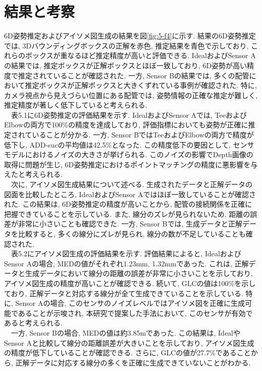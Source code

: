 \section{結果と考察}
6D姿勢推定およびアイソメ図生成の結果を図\ref{fig:5-f4}に示す. 
結果の6D姿勢推定では, 3Dバウンディングボックスの正解を赤色, 推定結果を青色で示しており, これらのボックスが重なるほど推定精度が高いと評価できる. 
IdealおよびSensor Aの結果では, 推定ボックスが正解ボックスとほぼ一致しており, 6D姿勢が高い精度で推定されていることが確認された. 
一方, Sensor Bの結果では, 多くの配管において推定ボックスが正解ボックスと大きくずれている事例が確認された. 
特に, カメラ視点から見えづらい位置にある配管では, 姿勢情報の正確な推定が難しく, 推定精度が著しく低下していると考えられる. \\
　表5.1に6D姿勢推定の評価結果を示す. 
IdealおよびSensor Aでは, TeeおよびElbowの両方で100\%の精度を達成しており, 評価指標においても姿勢が正確に推定されていることが分かる. 
一方, Sensor BではTeeおよびElbowの両方で精度が低下し, ADD-sucの平均値は42.5\%となった. 
この精度低下の要因として, センサモデルにおけるノイズの大きさが挙げられる. 
このノイズの影響でDepth画像の取得に問題が生じ, 6D姿勢推定におけるポイントマッチングの精度に悪影響を与えたと考えられる. \\
　次に, アイソメ図生成結果について述べる. 
生成されたデータと正解データの図面を比較したところ, IdealおよびSensor Aではほぼ一致していることが確認された. 
この結果は, 6D姿勢推定の精度が高いことから, 配管の接続関係を正確に把握できていることを示している. 
また, 線分のズレが見られないため, 距離の誤差が非常に小さいことも確認できた. 
一方, Sensor Bでは, 生成データと正解データを比較すると, 多くの線分にズレが見られ, 線分の数が不足していることも確認された. \\
　表5.2にアイソメ図生成の評価結果を示す. 
評価結果によると, IdealおよびSensor Aの場合, MEDの値がそれぞれ1.23mm, 1.32mmであった. 
これは, 正解データと生成データにおいて線分の距離の誤差が非常に小さいことを示しており, アイソメ図生成の精度が高いことが確認できる. 
続いて, GLCの値は100\%を示しており, 正解データと対応する線分が全て生成できていることを示している. 
特に, Sensor Aの場合, このセンサのノイズレベルではアイソメ図を正確に生成可能であることが示唆され, 本研究で提案した手法において, このセンサが有効であると考えられる. \\
　一方, Sensor Bの場合, MEDの値は約3.85mであった. 
この結果は, IdealやSensor Aと比較して線分の距離誤差が大きいことを示しており, アイソメ図生成の精度が低下していることが確認できる. 
さらに, GLCの値が27.7\%であることから, 正解データに対応する線分の多くを正確に生成できていないことがわかる. 
